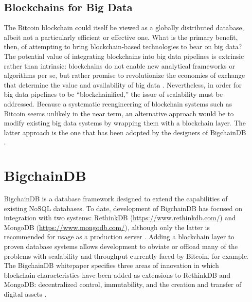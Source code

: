 \documentclass[sigconf]{acmart}
\begin{document}
\subsection{Blockchains for Big Data}
The Bitcoin blockchain could itself be viewed as a globally distributed database, albeit not a particularly efficient or effective one. What is the primary benefit, then, of attempting to bring blockchain-based technologies to bear on big data? The potential value of integrating blockchains into big data pipelines is extrinsic rather than intrinsic: blockchains do not enable new analytical frameworks or algorithms per se, but rather promise to revolutionize the economies of exchange that determine the value and availability of big data \cite{tMBD16}. Nevertheless, in order for big data pipelines to be ``blockchainified,'' the issue of scalability must be addressed. Because a systematic reengineering of blockchain systems such as Bitcoin seems unlikely in the near term, an alternative approach would be to modify existing big data systems by wrapping them with a blockchain layer. The latter approach is the one that has been adopted by the designers of BigchainDB \cite{bigDB16}.

\section{BigchainDB}
BigchainDB is a database framework designed to extend the capabilities of existing NoSQL databases. To date, development of BigchainDB has focused on integration with two systems: RethinkDB (\url{https://www.rethinkdb.com/}) and MongoDB (\url{https://www.mongodb.com/}), although only the latter is recommended for usage as a production server \cite{bigDB17b}. Adding a blockchain layer to proven database systems allows development to obviate or offload many of the problems with scalability and throughput currently faced by Bitcoin, for example. The BigchainDB whitepaper specifies three areas of innovation in which blockchain characteristics have been added as extensions to RethinkDB and MongoDB: decentralized control, immutability, and the creation and transfer of digital assets \cite{bigDB16}.
\end{document}
